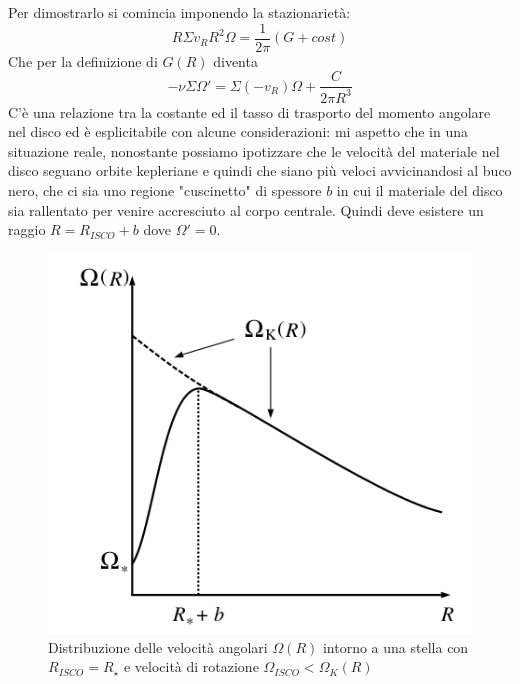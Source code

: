\documentclass[a4paperbi]{article}
\begin{document}
	Per dimostrarlo si comincia imponendo la stazionarietà:
	\begin{equation}
		R\Sigma v_RR^2\Omega=\frac{1}{2\pi}(G+cost)
	\end{equation}
	Che per la definizione di $G(R)$ diventa
	\begin{equation}
		-\nu\Sigma\Omega'=\Sigma(-v_R)\Omega+\frac{C}{2\pi R^3}
	\end{equation}
	C'è una relazione tra la costante ed il tasso di trasporto del momento angolare nel disco ed è esplicitabile con alcune considerazioni: mi aspetto che in una situazione reale, nonostante possiamo ipotizzare che le velocità del materiale nel disco seguano orbite kepleriane e quindi che siano più veloci avvicinandosi al buco nero, che ci sia uno regione "cuscinetto" di spessore $b$ in cui il materiale del disco sia rallentato per venire accresciuto al corpo centrale. Quindi deve esistere un raggio $R=R_{ISCO}+b$ dove $\Omega'=0$.
	
	\begin{figure}[H]
		\centering
		\includegraphics[width=0.7\linewidth]{InnerRegionAngularVelocity}
		\caption{Distribuzione delle velocità angolari $\Omega(R)$ intorno a una stella con $R_{ISCO}=R_\star$ e velocità di rotazione $\Omega_{ISCO}<\Omega_K(R)$}
		\label{fig:InnerRegionAngularVelocity}
	\end{figure}
	
\end{document}
